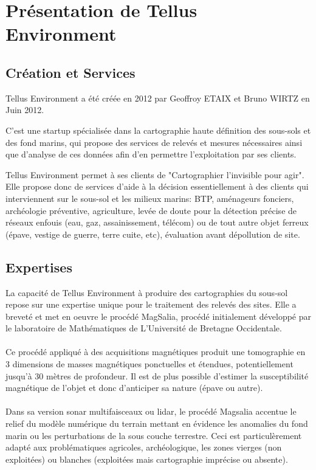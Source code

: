 \documentclass[12pt,a4paper]{report}
\begin{document}
\section{Présentation de Tellus Environment}
\subsection{Création et Services}
Tellus Environment a été créée en 2012 par Geoffroy ETAIX et Bruno WIRTZ en Juin 2012.

C'est une startup spécialisée dans la cartographie haute  définition des sous-sols et des fond marins, qui propose des services de relevés et mesures nécessaires ainsi que d'analyse de ces données afin d'en permettre l'exploitation par ses clients.

Tellus Environment permet à ses clients de "Cartographier l'invisible pour agir". Elle propose donc de services d'aide à la décision essentiellement à des clients qui interviennent sur le sous-sol et les milieux marins: BTP, aménageurs fonciers, archéologie préventive, agriculture, levée de doute pour la détection précise de réseaux enfouis (eau, gaz, assainissement, télécom) ou de tout autre objet ferreux (épave, vestige de guerre, terre cuite, etc), évaluation avant dépollution de site.

\subsection{Expertises}
La capacité de Tellus Environment à produire des cartographies du sous-sol repose  sur une expertise unique pour le traitement des relevés des sites. Elle a breveté et met en oeuvre le procédé MagSalia, procédé initialement développé par le laboratoire de Mathématiques de L'Université de Bretagne Occidentale.

\paragraph{} Ce procédé appliqué à des acquisitions magnétiques produit une tomographie en 3 dimensions de masses magnétiques ponctuelles et étendues, potentiellement jusqu'à 30 mètres de profondeur. Il est de plus possible d'estimer la susceptibilité magnétique de l'objet et donc d'anticiper sa nature (épave ou autre).

\paragraph{} Dans sa version sonar multifaisceaux ou lidar, le procédé Magsalia accentue le relief du modèle numérique du terrain mettant en évidence les anomalies du fond marin ou les perturbations de la sous couche terrestre. Ceci est particulèrement adapté aux problématiques agricoles, archéologique, les zones vierges (non exploitées) ou blanches (exploitées mais cartographie imprécise ou absente).
\end{document}

